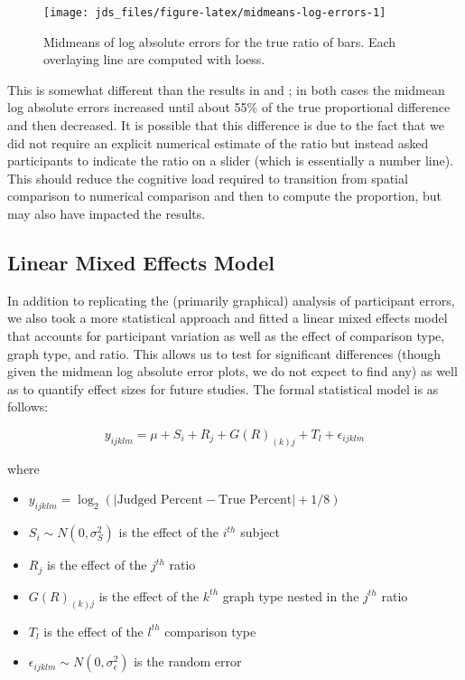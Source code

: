 \documentclass[letterpaper,inpress,dvipsnames]{jdsart}
\begin{document}
\begin{figure}
\texttt{[image: jds\_files/figure-latex/midmeans-log-errors-1]} \caption{Midmeans of log absolute errors for the true ratio of bars. Each overlaying line are computed with loess.}\label{fig:midmeans-log-errors}
\end{figure}

This is somewhat different than the results in \citet{cleveland_graphical_1984} and \citet{heerCrowdsourcingGraphicalPerception2010b}; in both cases the midmean log absolute errors increased until about 55\% of the true proportional difference and then decreased.
It is possible that this difference is due to the fact that we did not require an explicit numerical estimate of the ratio but instead asked participants to indicate the ratio on a slider (which is essentially a number line).
This should reduce the cognitive load required to transition from spatial comparison to numerical comparison and then to compute the proportion, but may also have impacted the results.

\hypertarget{linear-mixed-effects-model}{%
\subsection{Linear Mixed Effects Model}\label{linear-mixed-effects-model}}

In addition to replicating the (primarily graphical) analysis of participant errors, we also took a more statistical approach and fitted a linear mixed effects model that accounts for participant variation as well as the effect of comparison type, graph type, and ratio. This allows us to test for significant differences (though given the midmean log absolute error plots, we do not expect to find any) as well as to quantify effect sizes for future studies. The formal statistical model is as follows:

\[y_{ijklm}=\mu+S_i+R_j+G(R)_{(k)j}+T_l+\epsilon_{ijklm}\]

\noindent where

\begin{itemize}
\item
  \(y_{ijklm}=\log_2(|\text{Judged Percent} - \text{True Percent}|+1/8)\)
\item
  \(S_i\sim N(0,\sigma^2_S)\) is the effect of the \(i^{th}\) subject
\item
  \(R_j\) is the effect of the \(j^{th}\) ratio
\item
  \(G(R)_{(k)j}\) is the effect of the \(k^{th}\) graph type nested in the \(j^{th}\) ratio
\item
  \(T_l\) is the effect of the \(l^{th}\) comparison type
\item
  \(\epsilon_{ijklm}\sim N(0,\sigma^2_\epsilon)\) is the random error
\end{itemize}
\end{document}
